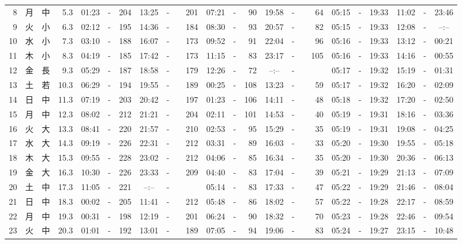 \documentclass[12pt,a4j]{jsarticle}
\begin{document}
\begin{table}[htbp]
\begin{center}
{\begin{tabular}{|rc|cr|ccrccr|ccrccr|ccc|ccc|}
 8 & 月 & 中 &  5.3 &  01:23 &-& 204 &  13:25 &-& 201 &  07:21 &-&  90 &  19:58 &-&  64 & 05:15 & -& 19:33 & 11:02 & -& 23:46 \\
 9 & 火 & 小 &  6.3 &  02:12 &-& 195 &  14:36 &-& 184 &  08:30 &-&  93 &  20:57 &-&  82 & 05:15 & -& 19:33 & 12:08 & -& --:-- \\
10 & 水 & 小 &  7.3 &  03:10 &-& 188 &  16:07 &-& 173 &  09:52 &-&  91 &  22:04 &-&  96 & 05:16 & -& 19:33 & 13:12 & -& 00:21 \\
11 & 木 & 小 &  8.3 &  04:19 &-& 185 &  17:42 &-& 173 &  11:15 &-&  83 &  23:17 &-& 105 & 05:16 & -& 19:33 & 14:16 & -& 00:55 \\
12 & 金 & 長 &  9.3 &  05:29 &-& 187 &  18:58 &-& 179 &  12:26 &-&  72 &  --:-- &-&~~~~~ & 05:17 & -& 19:32 & 15:19 & -& 01:31 \\
13 & 土 & 若 & 10.3 &  06:29 &-& 194 &  19:55 &-& 189 &  00:25 &-& 108 &  13:23 &-&  59 & 05:17 & -& 19:32 & 16:20 & -& 02:09 \\
14 & 日 & 中 & 11.3 &  07:19 &-& 203 &  20:42 &-& 197 &  01:23 &-& 106 &  14:11 &-&  48 & 05:18 & -& 19:32 & 17:20 & -& 02:50 \\
15 & 月 & 中 & 12.3 &  08:02 &-& 212 &  21:21 &-& 204 &  02:11 &-& 101 &  14:53 &-&  40 & 05:19 & -& 19:31 & 18:16 & -& 03:36 \\
16 & 火 & 大 & 13.3 &  08:41 &-& 220 &  21:57 &-& 210 &  02:53 &-&  95 &  15:29 &-&  35 & 05:19 & -& 19:31 & 19:08 & -& 04:25 \\
17 & 水 & 大 & 14.3 &  09:19 &-& 226 &  22:31 &-& 212 &  03:31 &-&  89 &  16:03 &-&  33 & 05:20 & -& 19:30 & 19:55 & -& 05:18 \\
18 & 木 & 大 & 15.3 &  09:55 &-& 228 &  23:02 &-& 212 &  04:06 &-&  85 &  16:34 &-&  35 & 05:20 & -& 19:30 & 20:36 & -& 06:13 \\
19 & 金 & 大 & 16.3 &  10:30 &-& 226 &  23:33 &-& 209 &  04:40 &-&  83 &  17:04 &-&  39 & 05:21 & -& 19:29 & 21:13 & -& 07:09 \\
20 & 土 & 中 & 17.3 &  11:05 &-& 221 &  --:-- &-&~~~~~ &  05:14 &-&  83 &  17:33 &-&  47 & 05:22 & -& 19:29 & 21:46 & -& 08:04 \\
21 & 日 & 中 & 18.3 &  00:02 &-& 205 &  11:41 &-& 212 &  05:48 &-&  86 &  18:02 &-&  57 & 05:22 & -& 19:28 & 22:17 & -& 08:59 \\
22 & 月 & 中 & 19.3 &  00:31 &-& 198 &  12:19 &-& 201 &  06:24 &-&  90 &  18:32 &-&  70 & 05:23 & -& 19:28 & 22:46 & -& 09:54 \\
23 & 火 & 中 & 20.3 &  01:01 &-& 192 &  13:01 &-& 189 &  07:05 &-&  94 &  19:06 &-&  83 & 05:24 & -& 19:27 & 23:15 & -& 10:48 \\

\end{tabular}}
\end{center}
\end{table}
\end{document}
